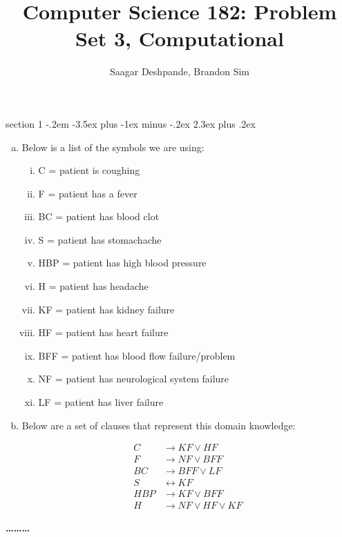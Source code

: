 \documentclass[12pt]{article}
\makeatletter
\newenvironment{problem}{\@startsection
       {section}
       {1}
       {-.2em}
       {-3.5ex plus -1ex minus -.2ex}
       {2.3ex plus .2ex}
       {\pagebreak[3] %
       \large\bf\noindent{Problem }
       }
       }
       {%
       \begin{center}\large\bf \ldots\ldots\ldots\end{center}}
\makeatother
\begin{document}
\title{Computer Science 182: Problem Set 3, Computational}
\author{Saagar Deshpande, Brandon Sim}

\maketitle

\begin{problem}{}
\begin{enumerate}[a.]
\item Below is a list of the symbols we are using:
\begin{enumerate}[i.]
\item C = patient is coughing
\item F = patient has a fever
\item BC = patient has blood clot
\item S = patient has stomachache
\item HBP = patient has high blood pressure
\item H = patient has headache

\item KF = patient has kidney failure
\item HF = patient has heart failure
\item BFF = patient has blood flow failure/problem
\item NF = patient has neurological system failure
\item LF = patient has liver failure
\end{enumerate}

\item Below are a set of clauses that represent this domain knowledge:

\begin{align*}
C &\rightarrow KF \lor HF\\
F &\rightarrow NF \lor BFF\\
BC &\rightarrow BFF \lor LF\\
S &\leftrightarrow KF\\
HBP &\rightarrow KF \lor BFF\\
H &\rightarrow NF \lor HF \lor KF
\end{align*}
\end{enumerate}
\end{problem}
\end{document}
